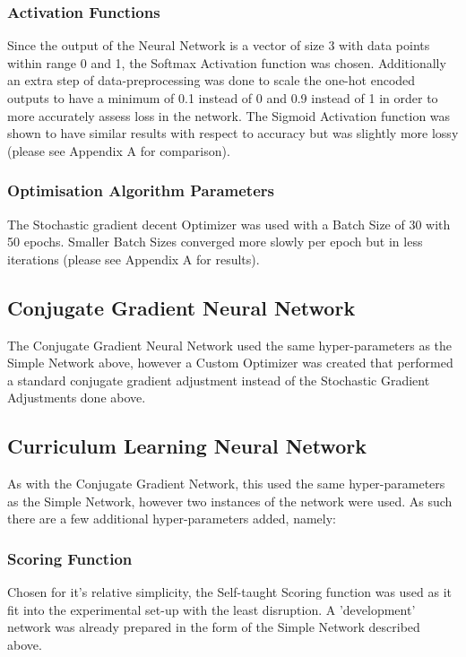 \documentclass[conference]{IEEEtran}
\begin{document}
\subsubsection{Activation Functions}
Since the output of the Neural Network is a vector of size 3 with data points within range 0 and 1, the Softmax Activation function was chosen. Additionally an extra step of data-preprocessing was done to scale the one-hot encoded outputs to have a minimum of 0.1 instead of 0 and 0.9 instead of 1 in order to more accurately assess loss in the network.
The Sigmoid Activation function was shown to have similar results with respect to accuracy but was slightly more lossy (please see Appendix A for comparison).

\subsubsection{Optimisation Algorithm Parameters}
The Stochastic gradient decent Optimizer was used with a Batch Size of 30 with 50 epochs. Smaller Batch Sizes converged more slowly per epoch but in less iterations (please see Appendix A for results).

\subsection{Conjugate Gradient Neural Network}
The Conjugate Gradient Neural Network used the same hyper-parameters as the Simple Network above, however a Custom Optimizer was created that performed a standard conjugate gradient adjustment instead of the Stochastic Gradient Adjustments done above.

\subsection{Curriculum Learning Neural Network}
As with the Conjugate Gradient Network, this used the same hyper-parameters as the Simple Network, however two instances of the network were used. As such there are a few additional hyper-parameters added, namely:
\subsubsection{Scoring Function}
Chosen for it's relative simplicity, the Self-taught Scoring function was used as it fit into the experimental set-up with the least disruption. A 'development' network was already prepared in the form of the Simple Network described above.
\end{document}
